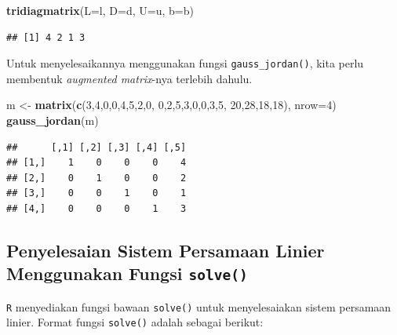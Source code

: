 \documentclass[]{book}
\newenvironment{Shaded}{\begin{snugshade}}{\end{snugshade}}
\newcommand{\DataTypeTok}[1]{\textcolor[rgb]{0.13,0.29,0.53}{#1}}
\newcommand{\DecValTok}[1]{\textcolor[rgb]{0.00,0.00,0.81}{#1}}
\newcommand{\KeywordTok}[1]{\textcolor[rgb]{0.13,0.29,0.53}{\textbf{#1}}}
\newcommand{\NormalTok}[1]{#1}
\newcommand{\StringTok}[1]{\textcolor[rgb]{0.31,0.60,0.02}{#1}}
\theoremstyle{definition}
\theoremstyle{definition}
\theoremstyle{definition}
\theoremstyle{remark}
\begin{document}
\begin{Shaded}
\begin{Highlighting}[]
\KeywordTok{tridiagmatrix}\NormalTok{(}\DataTypeTok{L=}\NormalTok{l, }\DataTypeTok{D=}\NormalTok{d, }\DataTypeTok{U=}\NormalTok{u, }\DataTypeTok{b=}\NormalTok{b)}
\end{Highlighting}
\end{Shaded}

\begin{verbatim}
## [1] 4 2 1 3
\end{verbatim}

Untuk menyelesaikannya menggunakan fungsi \texttt{gauss\_jordan()}, kita perlu membentuk \emph{augmented matrix}-nya terlebih dahulu.

\begin{Shaded}
\begin{Highlighting}[]
\NormalTok{m <-}\StringTok{ }\KeywordTok{matrix}\NormalTok{(}\KeywordTok{c}\NormalTok{(}\DecValTok{3}\NormalTok{,}\DecValTok{4}\NormalTok{,}\DecValTok{0}\NormalTok{,}\DecValTok{0}\NormalTok{,}\DecValTok{4}\NormalTok{,}\DecValTok{5}\NormalTok{,}\DecValTok{2}\NormalTok{,}\DecValTok{0}\NormalTok{,}
              \DecValTok{0}\NormalTok{,}\DecValTok{2}\NormalTok{,}\DecValTok{5}\NormalTok{,}\DecValTok{3}\NormalTok{,}\DecValTok{0}\NormalTok{,}\DecValTok{0}\NormalTok{,}\DecValTok{3}\NormalTok{,}\DecValTok{5}\NormalTok{,}
              \DecValTok{20}\NormalTok{,}\DecValTok{28}\NormalTok{,}\DecValTok{18}\NormalTok{,}\DecValTok{18}\NormalTok{), }\DataTypeTok{nrow=}\DecValTok{4}\NormalTok{)}
\KeywordTok{gauss_jordan}\NormalTok{(m)}
\end{Highlighting}
\end{Shaded}

\begin{verbatim}
##      [,1] [,2] [,3] [,4] [,5]
## [1,]    1    0    0    0    4
## [2,]    0    1    0    0    2
## [3,]    0    0    1    0    1
## [4,]    0    0    0    1    3
\end{verbatim}

\hypertarget{solvefunc}{%
\subsection{\texorpdfstring{Penyelesaian Sistem Persamaan Linier Menggunakan Fungsi \texttt{solve()}}{Penyelesaian Sistem Persamaan Linier Menggunakan Fungsi solve()}}\label{solvefunc}}

\texttt{R} menyediakan fungsi bawaan \texttt{solve()} untuk menyelesaiakan sistem persamaan linier. Format fungsi \texttt{solve()} adalah sebagai berikut:
\end{document}
